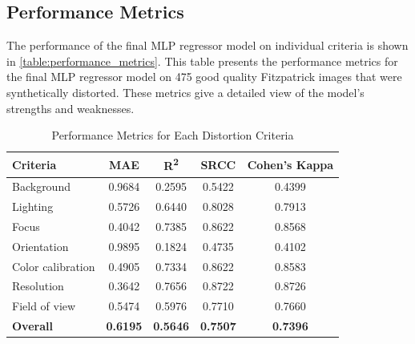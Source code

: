 \subsection{Performance Metrics}
\label{subsec:PerformanceMetrics}
The performance of the final MLP regressor model on individual criteria is shown in \autoref{table:performance_metrics}. This table presents the performance metrics for the final MLP regressor model on 475 good quality Fitzpatrick images that were synthetically distorted. These metrics give a detailed view of the model’s strengths and weaknesses. \par
 \begin{table}[ht]
    \centering
    \begin{tabular}{|l|c|c|c|c|}
        \hline
        \textbf{Criteria} & \textbf{MAE} & \textbf{R\textsuperscript{2}} & \textbf{SRCC} & \textbf{Cohen's Kappa} \\
        \hline
        Background & 0.9684 & 0.2595 & 0.5422 & 0.4399 \\
        Lighting & 0.5726 & 0.6440 & 0.8028 & 0.7913 \\
        Focus & 0.4042 & 0.7385 & 0.8622 & 0.8568 \\
        Orientation & 0.9895 & 0.1824 & 0.4735 & 0.4102 \\
        Color calibration & 0.4905 & 0.7334 & 0.8622 & 0.8583 \\
        Resolution & 0.3642 & 0.7656 & 0.8722 & 0.8726 \\
        Field of view & 0.5474 & 0.5976 & 0.7710 & 0.7660 \\
        \hline
        \textbf{Overall} & \textbf{0.6195} & \textbf{0.5646} & \textbf{0.7507} & \textbf{0.7396} \\
        \hline
    \end{tabular}
    \caption{Performance Metrics for Each Distortion Criteria}
    \label{table:performance_metrics}
\end{table}

\clearpage
